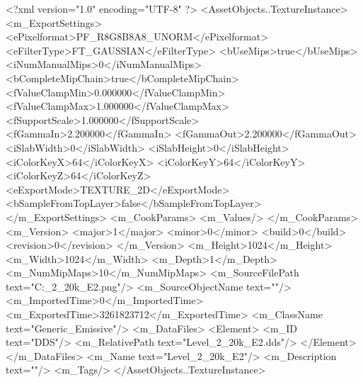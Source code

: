 <?xml version="1.0" encoding="UTF-8" ?>
<AssetObjects..TextureInstance>
	<m_ExportSettings>
		<ePixelformat>PF_R8G8B8A8_UNORM</ePixelformat>
		<eFilterType>FT_GAUSSIAN</eFilterType>
		<bUseMips>true</bUseMips>
		<iNumManualMips>0</iNumManualMips>
		<bCompleteMipChain>true</bCompleteMipChain>
		<fValueClampMin>0.000000</fValueClampMin>
		<fValueClampMax>1.000000</fValueClampMax>
		<fSupportScale>1.000000</fSupportScale>
		<fGammaIn>2.200000</fGammaIn>
		<fGammaOut>2.200000</fGammaOut>
		<iSlabWidth>0</iSlabWidth>
		<iSlabHeight>0</iSlabHeight>
		<iColorKeyX>64</iColorKeyX>
		<iColorKeyY>64</iColorKeyY>
		<iColorKeyZ>64</iColorKeyZ>
		<eExportMode>TEXTURE_2D</eExportMode>
		<bSampleFromTopLayer>false</bSampleFromTopLayer>
	</m_ExportSettings>
	<m_CookParams>
		<m_Values/>
	</m_CookParams>
	<m_Version>
		<major>1</major>
		<minor>0</minor>
		<build>0</build>
		<revision>0</revision>
	</m_Version>
	<m_Height>1024</m_Height>
	<m_Width>1024</m_Width>
	<m_Depth>1</m_Depth>
	<m_NumMipMaps>10</m_NumMipMaps>
	<m_SourceFilePath text="C:\Users\Shadow\Desktop\Prototypes\Level_2_20k_E2.png"/>
	<m_SourceObjectName text=""/>
	<m_ImportedTime>0</m_ImportedTime>
	<m_ExportedTime>3261823712</m_ExportedTime>
	<m_ClassName text="Generic_Emissive"/>
	<m_DataFiles>
		<Element>
			<m_ID text="DDS"/>
			<m_RelativePath text="Level_2_20k_E2.dds"/>
		</Element>
	</m_DataFiles>
	<m_Name text="Level_2_20k_E2"/>
	<m_Description text=""/>
	<m_Tags/>
</AssetObjects..TextureInstance>

